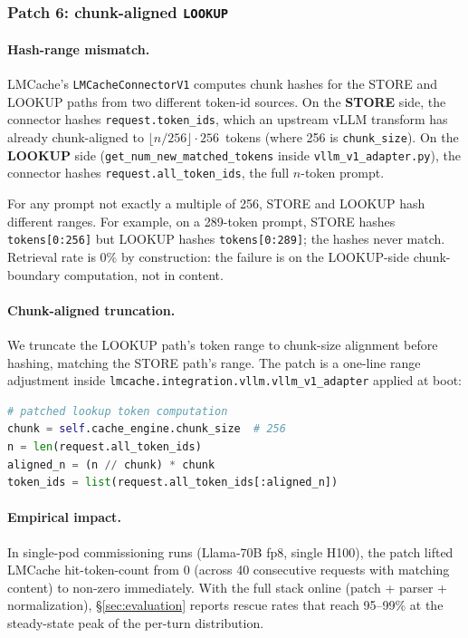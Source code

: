 \subsubsection{Patch 6: chunk-aligned \texttt{LOOKUP}}
\label{sec:patch6}

\paragraph{Hash-range mismatch.}
LMCache's \texttt{LMCacheConnectorV1} computes chunk hashes for the
STORE and LOOKUP paths from two different token-id sources. On the
\textbf{STORE} side, the connector hashes
\texttt{request.token\_ids}, which an upstream vLLM transform has
already chunk-aligned to
$\lfloor n/256 \rfloor \cdot 256$~tokens
(where 256 is \texttt{chunk\_size}). On the \textbf{LOOKUP} side
(\texttt{get\_num\_\allowbreak{}new\_\allowbreak{}matched\_\allowbreak{}tokens}
inside \texttt{vllm\_v1\_\allowbreak{}adapter.py}), the connector
hashes \texttt{request.\allowbreak{}all\_token\_ids}, the full
$n$-token prompt.

For any prompt not exactly a multiple of 256, STORE and LOOKUP hash
different ranges. For example, on a 289-token prompt, STORE hashes
\texttt{tokens[0:256]} but LOOKUP hashes \texttt{tokens[0:289]}; the
hashes never match. Retrieval rate is 0\% by construction: the failure
is on the LOOKUP-side chunk-boundary computation, not in content.

\paragraph{Chunk-aligned truncation.}
We truncate the LOOKUP path's token range to chunk-size alignment
before hashing, matching the STORE path's range. The patch is a
one-line range adjustment inside
\texttt{lmcache.\allowbreak{}integration.\allowbreak{}vllm.\allowbreak{}vllm\_v1\_adapter}
applied at boot:

\begin{lstlisting}[basicstyle=\ttfamily\footnotesize, breaklines=true, frame=single, framesep=4pt, breakindent=0pt, language=Python]
# patched lookup token computation
chunk = self.cache_engine.chunk_size  # 256
n = len(request.all_token_ids)
aligned_n = (n // chunk) * chunk
token_ids = list(request.all_token_ids[:aligned_n])
\end{lstlisting}

\paragraph{Empirical impact.}
In single-pod commissioning runs (Llama-70B fp8, single H100), the
patch lifted LMCache hit-token-count from 0 (across 40 consecutive
requests with matching content) to non-zero immediately. With the
full \sys{} stack online (patch + parser + normalization),
\S\ref{sec:evaluation} reports rescue rates that reach 95--99\% at
the steady-state peak of the per-turn distribution.

